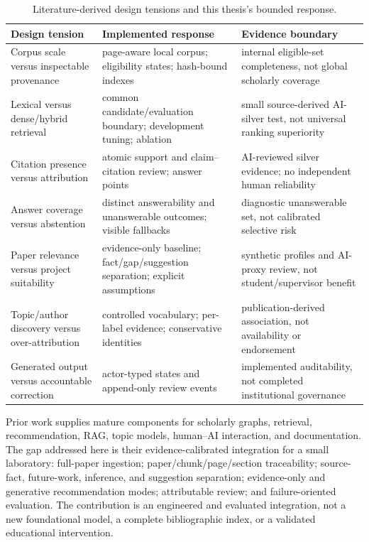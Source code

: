 \begin{table}[htbp]
\centering
\small
\caption{Literature-derived design tensions and this thesis's bounded response.}
\label{tab:literature-synthesis}
\begin{tabularx}{\textwidth}{P{35mm}P{48mm}Y}
\toprule
Design tension & Implemented response & Evidence boundary \\
\midrule
Corpus scale versus inspectable provenance & page-aware local corpus; eligibility states; hash-bound indexes & internal eligible-set completeness, not global scholarly coverage \\
Lexical versus dense/hybrid retrieval & common candidate/evaluation boundary; development tuning; ablation & small source-derived AI-silver test, not universal ranking superiority \\
Citation presence versus attribution & atomic support and claim--citation review; answer points & AI-reviewed silver evidence; no independent human reliability \\
Answer coverage versus abstention & distinct answerability and unanswerable outcomes; visible fallbacks & diagnostic unanswerable set, not calibrated selective risk \\
Paper relevance versus project suitability & evidence-only baseline; fact/gap/suggestion separation; explicit assumptions & synthetic profiles and AI-proxy review, not student/supervisor benefit \\
Topic/author discovery versus over-attribution & controlled vocabulary; per-label evidence; conservative identities & publication-derived association, not availability or endorsement \\
Generated output versus accountable correction & actor-typed states and append-only review events & implemented auditability, not completed institutional governance \\
\bottomrule
\end{tabularx}
\end{table}

Prior work supplies mature components for scholarly graphs, retrieval, recommendation, RAG, topic models, human--AI interaction, and documentation. The gap addressed here is their evidence-calibrated integration for a small laboratory: full-paper ingestion; paper/chunk/page/section traceability; source-fact, future-work, inference, and suggestion separation; evidence-only and generative recommendation modes; attributable review; and failure-oriented evaluation. The contribution is an engineered and evaluated integration, not a new foundational model, a complete bibliographic index, or a validated educational intervention.
